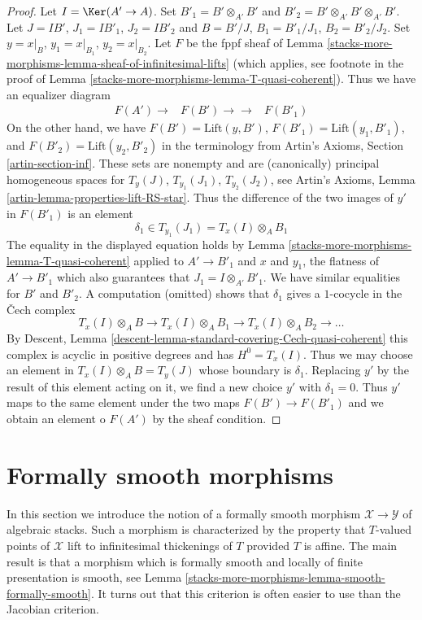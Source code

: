 \begin{proof}
Let $I = \Ker(A' \to A)$. Set $B'_1 = B' \otimes_{A'} B'$ and
$B'_2 = B' \otimes_{A'} B' \otimes_{A'} B'$. Let
$J = IB'$, $J_1 = IB'_1$, $J_2 = IB'_2$ and
$B = B'/J$, $B_1 = B'_1/J_1$, $B_2 = B'_2/J_2$.
Set $y = x|_B$, $y_1 = x|_{B_1}$, $y_2 = x|_{B_2}$.
Let $F$ be the fppf sheaf of
Lemma \ref{stacks-more-morphisms-lemma-sheaf-of-infinitesimal-lifts}
(which applies, see footnote in the proof of
Lemma \ref{stacks-more-morphisms-lemma-T-quasi-coherent}).
Thus we have an equalizer diagram
$$
\begin{array}{ccc}F(A') \longrightarrow & F(B') \longrightarrow\longrightarrow & F(B'_1)\end{array}
$$
On the other hand, we have $F(B') = \text{Lift}(y, B')$,
$F(B'_1) = \text{Lift}(y_1, B'_1)$, and $F(B'_2) = \text{Lift}(y_2, B'_2)$
in the terminology from Artin's Axioms, Section \ref{artin-section-inf}.
These sets are nonempty and are (canonically) principal homogeneous spaces for
$T_y(J)$, $T_{y_1}(J_1)$, $T_{y_2}(J_2)$, see
Artin's Axioms, Lemma \ref{artin-lemma-properties-lift-RS-star}.
Thus the difference of the two images of $y'$ in
$F(B'_1)$ is an element
$$
\delta_1 \in T_{y_1}(J_1) = T_x(I) \otimes_A B_1
$$
The equality in the displayed equation holds by
Lemma \ref{stacks-more-morphisms-lemma-T-quasi-coherent} applied to
$A' \to B'_1$ and $x$ and $y_1$, the flatness of $A' \to B'_1$
which also guarantees that $J_1 = I \otimes_{A'} B'_1$. We have
similar equalities for $B'$ and $B'_2$.
A computation (omitted) shows that $\delta_1$ gives
a $1$-cocycle in the {\v C}ech complex
$$
T_x(I) \otimes_A B \to
T_x(I) \otimes_A B_1 \to
T_x(I) \otimes_A B_2 \to \ldots
$$
By Descent, Lemma \ref{descent-lemma-standard-covering-Cech-quasi-coherent}
this complex is acyclic in positive degrees and has $H^0 = T_x(I)$.
Thus we may choose an element in $T_x(I) \otimes_A B = T_y(J)$
whose boundary is $\delta_1$. Replacing $y'$ by the result
of this element acting on it, we find a new choice $y'$ with $\delta_1 = 0$.
Thus $y'$ maps to the same element under the two maps
$F(B') \to F(B'_1)$ and we obtain an element o $F(A')$ by
the sheaf condition.
\end{proof}

\section{Formally smooth morphisms}
\label{stacks-more-morphisms-section-formally-smooth}
In this section we introduce the notion of a formally smooth morphism
$\mathcal{X} \to \mathcal{Y}$ of algebraic stacks. Such a morphism is
characterized by the property that $T$-valued points of $\mathcal{X}$ lift
to infinitesimal thickenings of $T$ provided $T$ is affine.
The main result is that a morphism which is formally smooth and
locally of finite presentation is smooth, see
Lemma \ref{stacks-more-morphisms-lemma-smooth-formally-smooth}.
It turns out that this criterion is often easier to use than the
Jacobian criterion.

